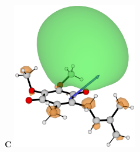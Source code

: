\documentclass[9pt,t,xcolor=table]{beamer}
\begin{document}
\begin{frame}
\begin{columns}[c]
\begin{column}{0.3\textwidth}
			\textbf{C} \includegraphics[width=0.41\textwidth]{Figs/Q1_112.png} \hfill 
		\end{column}
	\end{columns}		
\end{frame}
\end{document}

